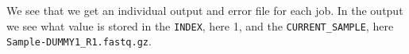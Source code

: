 \documentclass[
  letterpaper,
  DIV=11,
  numbers=noendperiod]{scrreprt}
\begin{document}
\begin{tcolorbox}
We see that we get an individual output and error file for each job. In
the output we see what value is stored in the \texttt{INDEX}, here 1,
and the \texttt{CURRENT\_SAMPLE}, here
\texttt{Sample-DUMMY1\_R1.fastq.gz}.

\end{tcolorbox}
\end{document}
